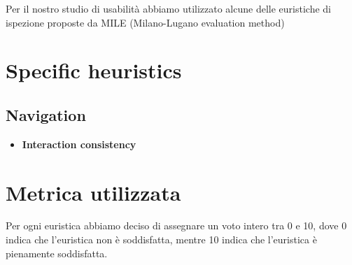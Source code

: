     Per il nostro studio di usabilità abbiamo utilizzato alcune delle euristiche
    di ispezione proposte da MILE (Milano-Lugano evaluation method)
    \section{Specific heuristics}
        \subsection{Navigation}
        \begin{itemize}
            \item \textbf{Interaction consistency}
        \end{itemize}
    \section{Metrica utilizzata} 
    Per ogni euristica abbiamo deciso di assegnare un voto intero tra 0 e 10,
    dove 0 indica che l'euristica non è soddisfatta, mentre 10 indica che
    l'euristica è pienamente soddisfatta. 
